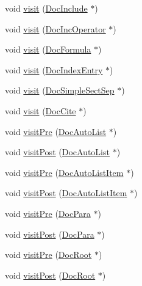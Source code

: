 \begin{DoxyCompactItemize}
\item 
void \hyperlink{class_perl_mod_doc_visitor_a3371fd84234867b003f58186568f22e8}{visit} (\hyperlink{class_doc_include}{Doc\+Include} $\ast$)
\item 
void \hyperlink{class_perl_mod_doc_visitor_a162eaa4d276eb3c2940ccf6d3a4d0427}{visit} (\hyperlink{class_doc_inc_operator}{Doc\+Inc\+Operator} $\ast$)
\item 
void \hyperlink{class_perl_mod_doc_visitor_a3560b1ca24662680bb7521f2cd700ef2}{visit} (\hyperlink{class_doc_formula}{Doc\+Formula} $\ast$)
\item 
void \hyperlink{class_perl_mod_doc_visitor_a12de654377ad0e92d22109f4c6734a66}{visit} (\hyperlink{class_doc_index_entry}{Doc\+Index\+Entry} $\ast$)
\item 
void \hyperlink{class_perl_mod_doc_visitor_a21c4a0e59d8b7485fbb63f67a24305d1}{visit} (\hyperlink{class_doc_simple_sect_sep}{Doc\+Simple\+Sect\+Sep} $\ast$)
\item 
void \hyperlink{class_perl_mod_doc_visitor_ab3b29d44aef74284e4a5e559ac9e0051}{visit} (\hyperlink{class_doc_cite}{Doc\+Cite} $\ast$)
\item 
void \hyperlink{class_perl_mod_doc_visitor_a943f576317b46ea69116c3b0e3b5637b}{visit\+Pre} (\hyperlink{class_doc_auto_list}{Doc\+Auto\+List} $\ast$)
\item 
void \hyperlink{class_perl_mod_doc_visitor_a0f62a539f3c237085e5e785bd8ff1fa8}{visit\+Post} (\hyperlink{class_doc_auto_list}{Doc\+Auto\+List} $\ast$)
\item 
void \hyperlink{class_perl_mod_doc_visitor_af189af66f2e0e142768673e6709126b8}{visit\+Pre} (\hyperlink{class_doc_auto_list_item}{Doc\+Auto\+List\+Item} $\ast$)
\item 
void \hyperlink{class_perl_mod_doc_visitor_a3e85e85bb876d233ae72affb28fa6711}{visit\+Post} (\hyperlink{class_doc_auto_list_item}{Doc\+Auto\+List\+Item} $\ast$)
\item 
void \hyperlink{class_perl_mod_doc_visitor_ad272cb11df7988943546a52ef8b55a0a}{visit\+Pre} (\hyperlink{class_doc_para}{Doc\+Para} $\ast$)
\item 
void \hyperlink{class_perl_mod_doc_visitor_aa866ed5844345ced9601563a31746805}{visit\+Post} (\hyperlink{class_doc_para}{Doc\+Para} $\ast$)
\item 
void \hyperlink{class_perl_mod_doc_visitor_a3cd866d1362085c952c45b70c961581f}{visit\+Pre} (\hyperlink{class_doc_root}{Doc\+Root} $\ast$)
\item 
void \hyperlink{class_perl_mod_doc_visitor_a4d99bda58fc9c5f83d57393a408c03b0}{visit\+Post} (\hyperlink{class_doc_root}{Doc\+Root} $\ast$)

\end{DoxyCompactItemize}
